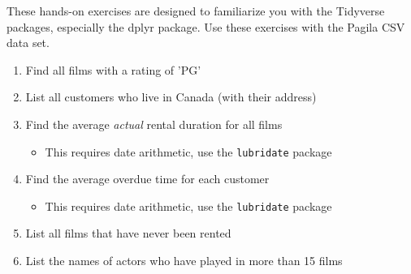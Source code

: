 \begin{exerciseboxcomputer}

These hands-on exercises are designed to familiarize you with the Tidyverse packages, especially the dplyr package. Use these exercises with the Pagila CSV data set.

\begin{enumerate}[nosep]
  \item Find all films with a rating of 'PG'
  \item List all customers who live in Canada (with their address)
  \item Find the average \emph{actual} rental duration for all films
  \begin{itemize}
     \item This requires date arithmetic, use the \texttt{lubridate} package
  \end{itemize}
  \item Find the average overdue time for each customer
  \begin{itemize}
     \item This requires date arithmetic, use the \texttt{lubridate} package
  \end{itemize}
  \item List all films that have never been rented
  \item List the names of actors who have played in more than 15 films
\end{enumerate}
\end{exerciseboxcomputer}
